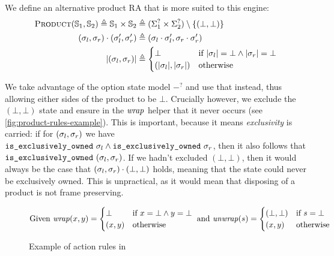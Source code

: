 We define an alternative product RA that is more suited to this engine: \begin{align*}
	\textsc{Product}(\mathbb S_1,\mathbb S_2) \triangleq \mathbb S_1 \times \mathbb S_2 &\triangleq (\Sigma_1^? \times \Sigma_2^?) \setminus \{(\bot, \bot)\}\\
	(\sigma_l, \sigma_r) \cdot (\sigma_l', \sigma_r') &\triangleq (\sigma_l \cdot \sigma_l', \sigma_r \cdot \sigma_r')\\
	|(\sigma_l, \sigma_r)| &\triangleq \begin{cases}
		\bot &\text{if}~|\sigma_l|=\bot\land |\sigma_r|=\bot\\
		(|\sigma_l|, |\sigma_r|) &\text{otherwise}
 	\end{cases}
\end{align*}

We take advantage of the option state model $-^?$ and use that instead, thus allowing either sides of the product to be $\bot$. Crucially however, we exclude the $(\bot, \bot)$ state and ensure in the ${\operatorname{\mathit{wrap}}}$ helper that it never occurs (see \autoref{fig:product-rules-example}). This is important, because it means \emph{exclusivity} is carried: if for $(\sigma_l,\sigma_r)$ we have ${\texttt{is\_exclusively\_owned}~\sigma_l \land \texttt{is\_exclusively\_owned}~\sigma_r}$, then it also follows that $\texttt{is\_exclusively\_owned}~(\sigma_l, \sigma_r)$. If we hadn't excluded $(\bot, \bot)$, then it would always be the case that $(\sigma_l,\sigma_r)\cdot(\bot,\bot)$ holds, meaning that the state could never be exclusively owned. This is unpractical, as it would mean that disposing of a product is not frame preserving.

\begin{figure}
	\centering
\begin{align*}
	\text{Given }
	{\operatorname{\mathit{wrap}}}(x, y) = \begin{cases}
		\bot &\text{if}~x=\bot \land y=\bot\\
		(x,y) &\text{otherwise}
	 \end{cases} \text{ and }
	 {\operatorname{\mathit{unwrap}}}(s) = \begin{cases}
 		(\bot, \bot) &\text{if} ~s=\bot\\
		(x, y) &\text{otherwise}
	 \end{cases}
\end{align*}
	\begin{mathpar}
\end{mathpar}
	\caption{Example of action rules in \Product}
	\label{fig:product-rules-example}
\end{figure}

